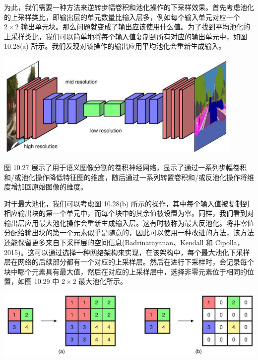 \documentclass[10pt]{article}
\begin{document}
为此，我们需要一种方法来逆转步幅卷积和池化操作的下采样效果。首先考虑池化的上采样类比，即输出层的单元数量比输入层多，例如每个输入单元对应一个 \(2 \times  2\) 输出单元块。那么问题就变成了输出应该使用什么值。为了找到平均池化的上采样类比，我们可以简单地将每个输入值复制到所有对应的输出单元中，如图 10.28(a) 所示。我们发现对该操作的输出应用平均池化会重新生成输入。

\begin{center}
\includegraphics[max width=0.9\textwidth]{images/0194e279-9b28-703a-88f4-c3ac21e2010d_336_331_342_1186_501_0.jpg}
\end{center}
\hspace*{3em} 

图 10.27 展示了用于语义图像分割的卷积神经网络，显示了通过一系列步幅卷积和/或池化操作降低特征图的维度，随后通过一系列转置卷积和/或反池化操作将维度增加回原始图像的维度。

对于最大池化，我们可以考虑图 10.28(b) 所示的操作，其中每个输入值被复制到相应输出块的第一个单元中，而每个块中的其余值被设置为零。同样，我们看到对输出层应用最大池化操作会重新生成输入层。这有时被称为最大反池化。将非零值分配给输出块的第一个元素似乎是随意的，因此可以使用一种改进的方法，该方法还能保留更多来自下采样层的空间信息(Badrinarayanan、Kendall 和 Cipolla，2015)。这可以通过选择一种网络架构来实现，在该架构中，每个最大池化下采样层在网络的后续部分都有一个对应的上采样层。然后在进行下采样时，会记录每个块中哪个元素具有最大值，然后在对应的上采样层中，选择非零元素位于相同的位置，如图 10.29 中 \(2 \times  2\) 最大池化所示。

\begin{center}
\includegraphics[max width=1.0\textwidth]{images/0194e279-9b28-703a-88f4-c3ac21e2010d_336_235_1601_1304_326_0.jpg}
\end{center}
\hspace*{3em} 
\end{document}
